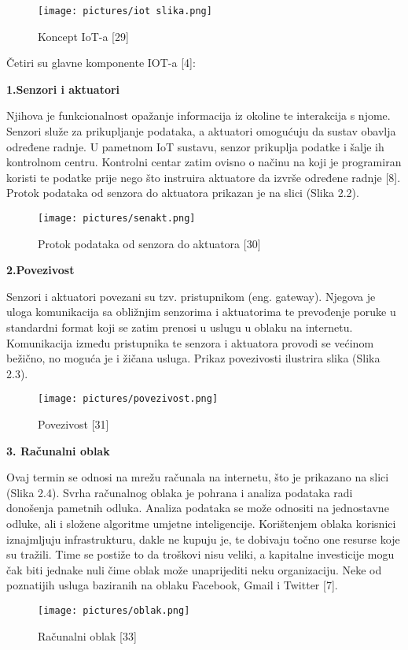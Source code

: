 \documentclass[times, utf8, zavrsni]{fer}
\begin{document}
  \begin{figure}[h]
			\texttt{[image: pictures/iot slika.png]} %
		\centering
			\caption{ Koncept IoT-a [29]}
			\label{fig:promjene}
\end{figure}
\newpage
  
 {\large Četiri su glavne komponente IOT-a [4]: }
  \vspace{\baselineskip}
  
   \textbf{1.Senzori i aktuatori}
   
   Njihova je funkcionalnost opažanje informacija iz okoline te interakcija s njome. Senzori služe za prikupljanje podataka, a aktuatori omogućuju da sustav obavlja određene radnje. U pametnom IoT sustavu, senzor prikuplja podatke i šalje ih kontrolnom centru. Kontrolni centar zatim ovisno o načinu na koji je programiran koristi te podatke prije nego što instruira aktuatore da izvrše određene radnje [8]. Protok podataka od senzora do aktuatora prikazan je na slici (Slika 2.2).
  \begin{figure}[h]
			\texttt{[image: pictures/senakt.png]} %
		\centering
			\caption{ Protok podataka od senzora do aktuatora [30]}
			\label{fig:promjene}
\end{figure}

 \newpage
 \textbf{2.Povezivost}

 Senzori i aktuatori povezani su tzv. pristupnikom (eng. gateway). Njegova je uloga komunikacija sa obližnjim senzorima i aktuatorima te prevođenje poruke u standardni format koji se zatim prenosi u uslugu u oblaku na internetu. Komunikacija između pristupnika te senzora i aktuatora provodi se većinom bežično, no moguća je i žičana usluga. Prikaz povezivosti ilustrira slika (Slika 2.3).
 \begin{figure}[h]
			\texttt{[image: pictures/povezivost.png]} %
		\centering
			\caption{ Povezivost [31]}
			\label{fig:promjene}
\end{figure}

\textbf{3. Računalni oblak}

 Ovaj termin se odnosi na mrežu računala na internetu, što je prikazano na slici (Slika 2.4). Svrha računalnog oblaka je pohrana i analiza podataka radi donošenja pametnih odluka. Analiza podataka se može odnositi na jednostavne odluke, ali i složene algoritme umjetne inteligencije. Korištenjem oblaka korisnici iznajmljuju infrastrukturu, dakle ne kupuju je, te dobivaju točno one resurse koje su tražili. Time se postiže to da troškovi nisu veliki, a kapitalne investicije mogu čak biti jednake nuli čime oblak može unaprijediti neku organizaciju. Neke od poznatijih usluga baziranih na oblaku Facebook, Gmail i Twitter [7].
 \begin{figure}[h]
			\texttt{[image: pictures/oblak.png]} %
		\centering
			\caption{ Računalni oblak [33]}
			\label{fig:promjene}
\end{figure}
\end{document}
